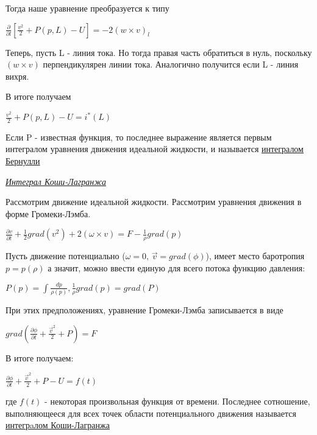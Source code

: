 Тогда наше уравнение преобразуется к типу
\begin{center}
	$\frac{\partial}{\partial l}[ \frac{v^2}{2} + P(p,L) - U] = -2(w\times v)_l$
\end{center}
Теперь, пусть L - линия тока. Но тогда правая часть обратиться в нуль, поскольку $(w\times v)$ перпендикулярен линии тока. Аналогично получится если L - линия вихря.


В итоге получаем 
\begin{center}
	$\frac{v^2}{2} + P(p,L) - U = i^*(L)$
\end{center}
Если P - известная функция, то последнее выражение является первым интегралом уравнения движения идеальной жидкости, и называется \underline{интегралом Бернулли}
\begin{center}
	\textit{\underline{Интеграл Коши-Лагранжа}}
\end{center}
Рассмотрим движение идеальной жидкости. Рассмотрим уравнения движения в форме Громеки-Лэмба.
\begin{center}
	$\frac{\partial v}{\partial t} + \frac{1}{2}grad(v^2) + 2(\omega\times v) = F - \frac{1}{\rho}grad(p)$
\end{center}
Пусть движение потенциально ($\omega = 0,\, \vec{v} = grad(\phi)$), имеет место баротропия $p = p(\rho)$ а значит, можно ввести единую для всего потока функцию давления:
\begin{center}
	$P(p) = \int \frac{dp}{\rho(p)}, \frac{1}{\rho}grad(p) = grad(P)$
\end{center}
При этих предположениях, уравнение Громеки-Лэмба записывается в виде
\begin{center}
	$grad(\frac{\partial\phi}{\partial t} + \frac{\vec{v}^2}{2} + P) = F$
\end{center}
В итоге получаем:
\begin{center}
	$\frac{\partial\phi}{\partial t} + \frac{\vec{v}^2}{2} + P - U = f(t)$
\end{center}
где $f(t)$ - некоторая произвольная функция от времени.
Последнее сотношение, выполняющееся для всех точек области потенциального движения называется \underline{интегрaлом Коши-Лагранжа}
